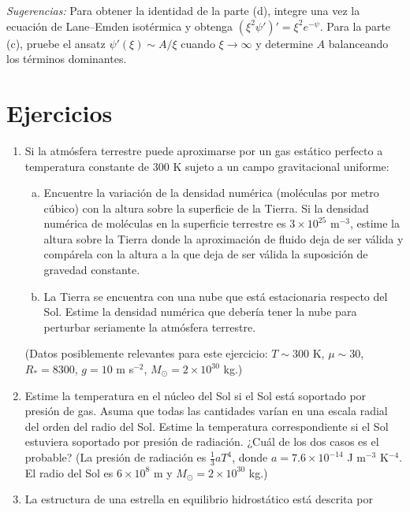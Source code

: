 \textit{Sugerencias:} Para obtener la identidad de la parte (d), integre una vez la ecuación de Lane--Emden isotérmica y obtenga $(\xi^2\psi')' = \xi^2 e^{-\psi}$. Para la parte (c), pruebe el ansatz $\psi'(\xi) \sim A/\xi$ cuando $\xi \to \infty$ y determine $A$ balanceando los términos dominantes.

\section{Ejercicios}

\begin{enumerate}
\item Si la atmósfera terrestre puede aproximarse por un gas estático perfecto a temperatura constante de 300 K sujeto a un campo gravitacional uniforme:
\begin{enumerate}[(a)]
\item Encuentre la variación de la densidad numérica (moléculas por metro cúbico) con la altura sobre la superficie de la Tierra. Si la densidad numérica de moléculas en la superficie terrestre es $3 \times 10^{25}$ m$^{-3}$, estime la altura sobre la Tierra donde la aproximación de fluido deja de ser válida y compárela con la altura a la que deja de ser válida la suposición de gravedad constante.

\item La Tierra se encuentra con una nube que está estacionaria respecto del Sol. Estime la densidad numérica que debería tener la nube para perturbar seriamente la atmósfera terrestre.
\end{enumerate}

(Datos posiblemente relevantes para este ejercicio: $T \sim 300$ K, $\mu \sim 30$, $R_* = 8300$, $g = 10$ m s$^{-2}$, $M_\odot = 2 \times 10^{30}$ kg.)

\item Estime la temperatura en el núcleo del Sol si el Sol está soportado por presión de gas. Asuma que todas las cantidades varían en una escala radial del orden del radio del Sol. Estime la temperatura correspondiente si el Sol estuviera soportado por presión de radiación. ¿Cuál de los dos casos es el probable? (La presión de radiación es $\frac{1}{3}aT^4$, donde $a = 7.6 \times 10^{-14}$ J m$^{-3}$ K$^{-4}$. El radio del Sol es $6 \times 10^8$ m y $M_\odot = 2 \times 10^{30}$ kg.)

\item La estructura de una estrella en equilibrio hidrostático está descrita por


\end{enumerate}
